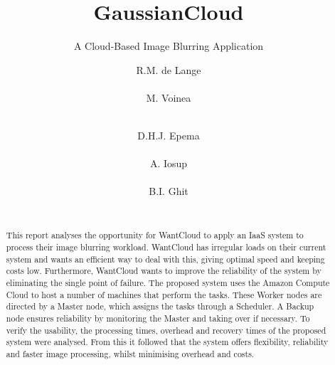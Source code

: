 \documentclass{acm_proc_article-sp}
\begin{document}
\title{GaussianCloud}
\subtitle{A Cloud-Based Image Blurring Application}

\author{
\alignauthor
R.M. de Lange\\
		\\
\alignauthor
M. Voinea\\
		\\
\and
\alignauthor
D.H.J. Epema\\
		\\
\alignauthor
A. Iosup\\
		\\
\alignauthor
B.I. Ghit\\
		\\
}

\maketitle

\begin{abstract}
This report analyses the opportunity for WantCloud to apply an IaaS system to process their image blurring workload.
WantCloud has irregular loads on their current system and wants an efficient way to deal with this, giving optimal speed and keeping costs low.
Furthermore, WantCloud wants to improve the reliability of the system by eliminating the single point of failure.
The proposed system uses the Amazon Compute Cloud to host a number of machines that perform the tasks.
These Worker nodes are directed by a Master node, which assigns the tasks through a Scheduler.
A Backup node ensures reliability by monitoring the Master and taking over if necessary.
To verify the usability, the processing times, overhead and recovery times of the proposed system were analysed.
From this it followed that the system offers flexibility, reliability and faster image processing, whilst minimising overhead and costs.
\end{abstract}

\end{document}
